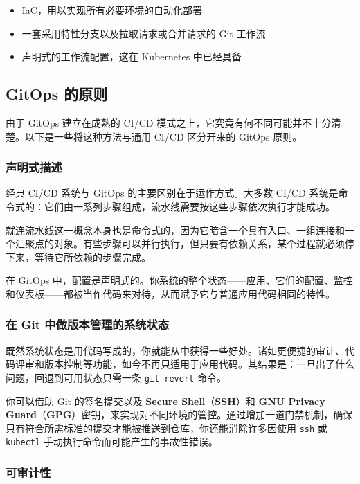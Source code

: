 \begin{itemize}
\item IaC，用以实现所有必要环境的自动化部署
\item 一套采用特性分支以及拉取请求或合并请求的 Git 工作流
\item 声明式的工作流配置，这在 Kubernetes 中已经具备
\end{itemize}

\subsection{GitOps 的原则}

\label{idx:2063}
由于 GitOps 建立在成熟的 CI/CD 模式之上，它究竟有何不同可能并不十分清楚。以下是一些将这种方法与通用 CI/CD 区分开来的 GitOps 原则。

\subsubsection{声明式描述}

经典 CI/CD 系统与 GitOps 的主要区别在于运作方式。大多数 CI/CD 系统是命令式的：它们由一系列步骤组成，流水线需要按这些步骤依次执行才能成功。

\label{idx:2064}
就连流水线这一概念本身也是命令式的，因为它暗含一个具有入口、一组连接和一个汇聚点的对象。有些步骤可以并行执行，但只要有依赖关系，某个过程就必须停下来，等待它所依赖的步骤完成。

在 GitOps 中，配置是声明式的。你系统的整个状态——应用、它们的配置、监控和仪表板——都被当作代码来对待，从而赋予它与普通应用代码相同的特性。

\subsubsection{在 Git 中做版本管理的系统状态}

\label{idx:2065}
既然系统状态是用代码写成的，你就能从中获得一些好处。诸如更便捷的审计、代码评审和版本控制等功能，如今不再只适用于应用代码。其结果是：一旦出了什么问题，回退到可用状态只需一条 \texttt{git revert} 命令。

\label{idx:2066}
\label{idx:2067}
你可以借助 Git 的签名提交以及 \textbf{Secure Shell}（\textbf{SSH}）和 \textbf{GNU Privacy Guard}（\textbf{GPG}）密钥，来实现对不同环境的管控。通过增加一道门禁机制，确保只有符合所需标准的提交才能被推送到仓库，你还能消除许多因使用 \texttt{ssh} 或 \texttt{kubectl} 手动执行命令而可能产生的事故性错误。

\subsubsection{可审计性}

